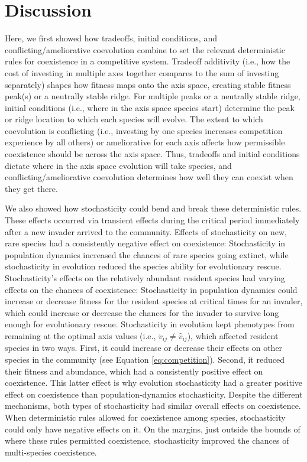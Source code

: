 
\section*{Discussion}

Here, we first showed how tradeoffs, initial conditions, and conflicting/ameliorative coevolution
combine to set the relevant deterministic rules for coexistence in a competitive system.
Tradeoff additivity (i.e., how the cost of investing in multiple axes together 
compares to the sum of investing separately) shapes how fitness maps onto the axis space,
creating stable fitness peak(s) or a neutrally stable ridge.
For multiple peaks or a neutrally stable ridge, initial conditions (i.e., where in the 
axis space species start) determine the peak or ridge location to which each species will evolve.
The extent to which coevolution is conflicting (i.e., investing by one species increases 
competition experience by all others) or ameliorative for each axis affects
how permissible coexistence should be across the axis space.
Thus, tradeoffs and initial conditions dictate where in the axis space evolution will take species, and 
conflicting/ameliorative coevolution determines how well they can 
coexist when they get there.






We also showed how stochasticity could bend and break these deterministic rules.
These effects occurred via transient effects during the critical period
immediately after a new invader arrived to the community.
Effects of stochasticity on new, rare species had a consistently negative
effect on coexistence:
Stochasticity in population dynamics increased the chances of rare species going extinct,
while stochasticity in evolution reduced the species ability for evolutionary rescue.
Stochasticity's effects on the relatively abundant resident species
had varying effects on the chances of coexistence:
Stochasticity in population dynamics could increase or decrease fitness for
the resident species at critical times for an invader, which
could increase or decrease the chances for the invader to survive long enough 
for evolutionary rescue.
Stochasticity in evolution kept phenotypes from remaining at the optimal 
axis values (i.e., $\ddot{v}_{ij} \ne \hat{v}_{ij}$),
which affected resident species in two ways.
First, it could increase or decrease their effects on other species in the community
(see Equation \ref{eq:competition}).
Second, it reduced their fitness and abundance, which had a consistently 
positive effect on coexistence.
This latter effect is why evolution stochasticity had a greater positive effect
on coexistence than population-dynamics stochasticity.
Despite the different mechanisms, both types of stochasticity had similar 
overall effects on coexistence.
When deterministic rules allowed for coexistence among species, 
stochasticity could only have negative effects on it.
On the margins, just outside the bounds of where these rules permitted coexistence, 
stochasticity improved the chances of multi-species coexistence.









